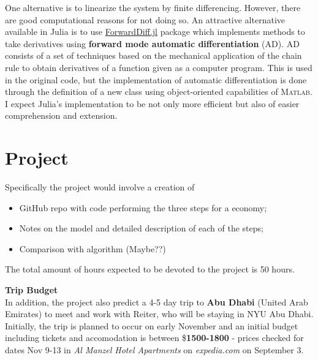 \documentclass[paper=a4, fontsize=11pt, twosided]{article}  %
\numberwithin{equation}{section}        %
\numberwithin{figure}{section}          %
\numberwithin{table}{section}               %
\theoremstyle{plain}
\begin{document}
One alternative is to linearize the system by finite differencing. However, there are good computational reasons for not doing so.
An attractive alternative available in Julia is to use \href{https://github.com/JuliaDiff/ForwardDiff.jl}{ForwardDiff.jl} package which implements methods to take derivatives using \textbf{forward mode automatic differentiation} (AD).
AD consists of a set of techniques based on the mechanical application of the chain rule to obtain derivatives of a
function given as a computer program. This is used in the original code, but the implementation of automatic differentiation
is done through the definition of a new class using object-oriented capabilities of \textsc{Matlab}. I expect Julia's
implementation to be not only more efficient but also of easier comprehension and extension.


\section{Project} %
\label{sec:project}

Specifically the project would involve a creation of
\begin{itemize}

   \item GitHub repo with code performing the three steps for a \citet{krusellsmith} economy;

   \item Notes on the model and detailed description of each of the steps;

   \item Comparison with \citet{krusellsmith} algorithm (Maybe??)

\end{itemize}
The total amount of hours expected to be devoted to the project is 50 hours.

\textbf{Trip Budget } \\
In addition, the project also predict a 4-5 day trip to
\textbf{Abu Dhabi} (United Arab Emirates) to meet and work with Reiter, who will be staying in NYU Abu Dhabi.
%
Initially, the trip is planned to occur on early November and an initial budget including tickets and accomodation
is between \$\textbf{1500-1800} -
prices checked for dates Nov 9-13 in \emph{Al Manzel Hotel Apartments} on \emph{expedia.com} on September 3.
\end{document}
